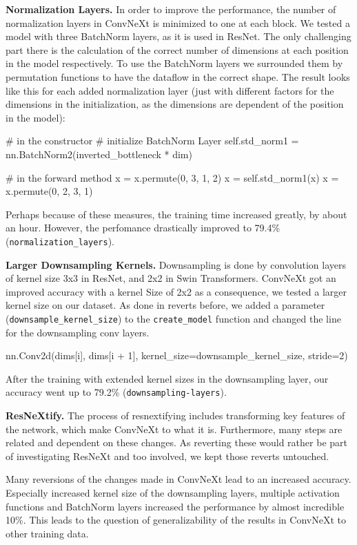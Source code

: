 \documentclass{article}
\begin{document}
\textbf{Normalization Layers.}
In order to improve the performance, the number of normalization layers in ConvNeXt is minimized to one at each block.
We tested a model with three BatchNorm layers, as it is used in ResNet.
The only challenging part there is the calculation of the correct number of dimensions at each position in the model respectively.
To use the BatchNorm layers we surrounded them by permutation functions to have the dataflow in the correct shape.
The result looks like this for each added normalization layer (just with different factors for the dimensions in the initialization, as the dimensions are dependent of the position in the model):
\begin{python}
# in the constructor
# initialize BatchNorm Layer
self.std_norm1 = nn.BatchNorm2(inverted_bottleneck * dim)

# in the forward method
x = x.permute(0, 3, 1, 2)
x = self.std_norm1(x)
x = x.permute(0, 2, 3, 1)
\end{python}
Perhaps because of these measures, the training time increased greatly, by about an hour.
However, the perfomance drastically improved to 79.4\% (\texttt{normalization\_layers}).

\textbf{Larger Downsampling Kernels.}
Downsampling is done by convolution layers of kernel size 3x3 in ResNet, and 2x2 in Swin Transformers.
ConvNeXt got an improved accuracy with a kernel Size of 2x2 as a consequence, we tested a larger kernel size on our dataset.
As done in reverts before, we added a parameter (\texttt{downsample\_kernel\_size}) to the \texttt{create\_model} function and changed the line for the downsampling conv layers.
\begin{python}
nn.Conv2d(dims[i], dims[i + 1],
        kernel_size=downsample_kernel_size, stride=2)
\end{python}
After the training with extended kernel sizes in the downsampling layer, our accuracy went up to 79.2\% (\texttt{downsampling-layers}).

\textbf{ResNeXtify.}
The process of resnextifying includes transforming key features of the network, which make ConvNeXt to what it is.
Furthermore, many steps are related and dependent on these changes.
As reverting these would rather be part of investigating ResNeXt and too involved, we kept those reverts untouched.

Many reversions of the changes made in ConvNeXt lead to an increased accuracy.
Especially increased kernel size of the downsampling layers, multiple activation functions and BatchNorm layers increased the performance by almost incredible 10\%.
This leads to the question of generalizability of the results in ConvNeXt to other training data.
\end{document}

